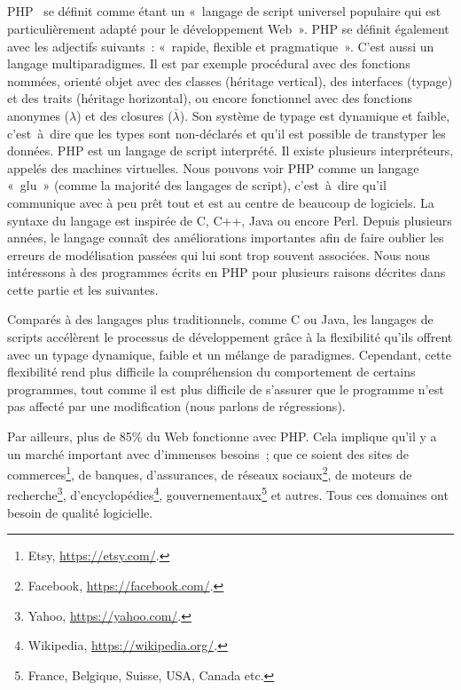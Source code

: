 \subsection{}

PHP~ se définit comme étant un «~langage de script universel
populaire qui est particulièrement adapté pour le développement Web~». PHP se
définit également avec les adjectifs suivants~: «~rapide, flexible et
pragmatique~». C'est aussi un langage multiparadigmes. Il est par exemple
procédural avec des fonctions nommées, orienté objet avec des classes (héritage
vertical), des interfaces (typage) et des traits (héritage horizontal), ou
encore fonctionnel avec des fonctions anonymes ($\lambda$) et des closures
($\overline{\lambda}$). Son système de typage est dynamique et faible,
c'est~à~dire que les types sont non-déclarés et qu'il est possible de transtyper
les données. PHP est un langage de script interprété. Il existe plusieurs
interpréteurs, appelés des machines virtuelles. Nous pouvons voir PHP comme un
langage «~glu~» (comme la majorité des langages de script), c'est~à~dire qu'il
communique avec à peu prêt tout et est au centre de beaucoup de logiciels. La
syntaxe du langage est inspirée de C, C++, Java ou encore Perl.  Depuis
plusieurs années, le langage connaît des améliorations importantes afin de faire
oublier les erreurs de modélisation passées qui lui sont trop souvent associées.
Nous nous intéressons à des programmes écrits en PHP pour plusieurs raisons
décrites dans cette partie et les suivantes.

Comparés à des langages plus traditionnels, comme C ou Java, les langages de
scripts accélèrent le processus de développement grâce à la flexibilité qu'ils
offrent avec un typage dynamique, faible et un mélange de paradigmes. Cependant,
cette flexibilité rend plus difficile la compréhension du comportement de
certains programmes, tout comme il est plus difficile de s'assurer que le
programme n'est pas affecté par une modification (nous parlons de régressions).

Par ailleurs, plus de 85\% du Web fonctionne avec PHP. Cela implique qu'il y a
un marché important avec d'immenses besoins~; que ce soient des sites de
commerces\footnote{Etsy, \url{https://etsy.com/}.}, de banques, d'assurances, de
réseaux sociaux\footnote{Facebook, \url{https://facebook.com/}.}, de moteurs de
recherche\footnote{Yahoo, \url{https://yahoo.com/}.},
d'encyclopédies\footnote{Wikipedia, \url{https://wikipedia.org/}.},
gouvernementaux\footnote{France, Belgique, Suisse, USA, Canada etc.} et autres.
Tous ces domaines ont besoin de qualité logicielle.

